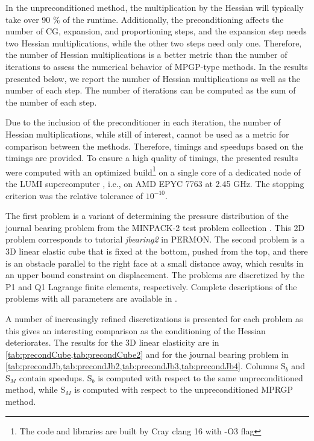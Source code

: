 \documentclass[11pt]{article}
\theoremstyle{plain}
\theoremstyle{definition}
\begin{document}
In the unpreconditioned method, the multiplication by the Hessian will typically take over 90 \% of the runtime.
Additionally, the preconditioning affects the number of CG, expansion, and proportioning steps, and the expansion step needs two Hessian multiplications, while the other two steps need only one.
Therefore, the number of Hessian multiplications is a better metric than the number of iterations to assess the numerical behavior of MPGP-type methods.
In the results presented below, we report the number of Hessian multiplications as well as the number of each step.
The number of iterations can be computed as the sum of the number of each step.

Due to the inclusion of the preconditioner in each iteration, the number of Hessian multiplications, while still of interest, cannot be used as a metric for comparison between the methods.
Therefore, timings and speedups based on the timings are provided.
To ensure a high quality of timings, the presented results were computed with an optimized build\footnote{The code and libraries are built by Cray clang 16 with -O3 flag} on a single core of a dedicated node of the LUMI supercomputer \cite{lumi}, i.e., on AMD EPYC 7763 at 2.45 GHz.
The stopping criterion was the relative tolerance of $10^{-10}$.

The first problem is a variant of determining the pressure distribution of the journal bearing problem from the MINPACK-2 test problem collection \cite{Averick1992}.
This 2D problem corresponds to tutorial \emph{jbearing2} in PERMON.
The second problem is a 3D linear elastic cube that is fixed at the bottom, pushed from the top, and there is an obstacle parallel to the right face at a small distance away, which results in an upper bound constraint on displacement.
The problems are discretized by the P1 and Q1 Lagrange finite elements, respectively.
Complete descriptions of the problems with all parameters are available in \cite{KruzikPhD}.

A number of increasingly refined discretizations is presented for each problem as this gives an interesting comparison as the conditioning of the Hessian deteriorates.
The results for the 3D linear elasticity are in \cref{tab:precondCube,tab:precondCube2} and for the journal bearing problem in \cref{tab:precondJb,tab:precondJb2,tab:precondJb3,tab:precondJb4}.
Columns S$_b$ and S$_M$ contain speedups.
S$_b$ is computed with respect to the same unpreconditioned method, while S$_M$ is computed with respect to the unpreconditioned MPRGP method.
\end{document}
